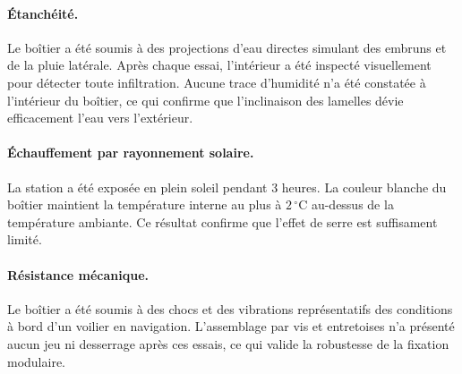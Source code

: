 \paragraph{Étanchéité.}
Le boîtier a été soumis à des projections d'eau directes simulant des embruns et de la pluie latérale. Après chaque essai, l'intérieur a été inspecté visuellement pour détecter toute infiltration. Aucune trace d'humidité n'a été constatée à l'intérieur du boîtier, ce qui confirme que l'inclinaison des lamelles dévie efficacement l'eau vers l'extérieur.

\paragraph{Échauffement par rayonnement solaire.}
La station a été exposée en plein soleil pendant 3 heures. La couleur blanche du boîtier maintient la température interne au plus à \(2\,^\circ\text{C}\) au-dessus de la température ambiante. Ce résultat confirme que l'effet de serre est suffisament limité.

\paragraph{Résistance mécanique.}
Le boîtier a été soumis à des chocs et des vibrations représentatifs des conditions à bord d'un voilier en navigation. L'assemblage par vis et entretoises n'a présenté aucun jeu ni desserrage après ces essais, ce qui valide la robustesse de la fixation modulaire.
